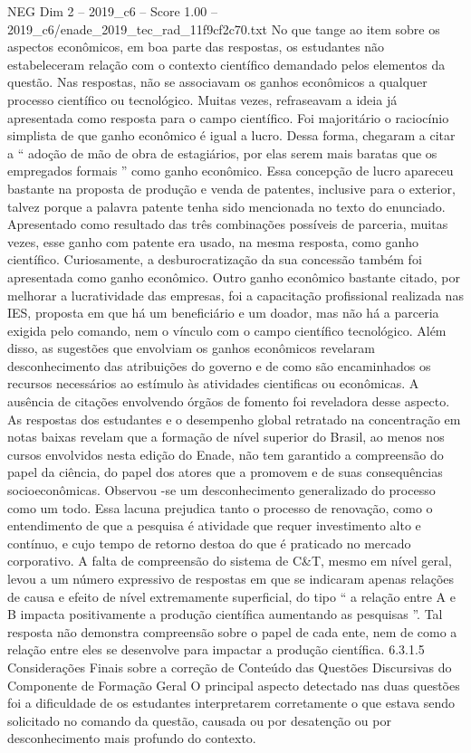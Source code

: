\begin{textsample}{NEG Dim 2 – 2019\_c6 – Score 1.00 – 2019\_c6/enade\_2019\_tec\_rad\_11f9cf2c70.txt}
No que tange ao item sobre os aspectos econômicos, em boa parte das respostas, os estudantes não estabeleceram relação com o contexto científico demandado pelos elementos da questão.
Nas respostas, não se associavam os ganhos econômicos a qualquer processo científico ou tecnológico.
Muitas vezes, refraseavam a ideia já apresentada como resposta para o campo científico.
Foi majoritário o raciocínio simplista de que ganho econômico é igual a lucro.
Dessa forma, chegaram a citar a “ adoção de mão de obra de estagiários, por elas serem mais baratas que os empregados formais ” como ganho econômico.
Essa concepção de lucro apareceu bastante na proposta de produção e venda de patentes, inclusive para o exterior, talvez porque a palavra patente tenha sido mencionada no texto do enunciado.
Apresentado como resultado das três combinações possíveis de parceria, muitas vezes, esse ganho com patente era usado, na mesma resposta, como ganho científico.
Curiosamente, a desburocratização da sua concessão também foi apresentada como ganho econômico.
Outro ganho econômico bastante citado, por melhorar a lucratividade das empresas, foi a capacitação profissional realizada nas IES, proposta em que há um beneficiário e um doador, mas não há a parceria exigida pelo comando, nem o vínculo com o campo científico tecnológico.
Além disso, as sugestões que envolviam os ganhos econômicos revelaram desconhecimento das atribuições do governo e de como são encaminhados os recursos necessários ao estímulo às atividades cientificas ou econômicas.
A ausência de citações envolvendo órgãos de fomento foi reveladora desse aspecto.
As respostas dos estudantes e o desempenho global retratado na concentração em notas baixas revelam que a formação de nível superior do Brasil, ao menos nos cursos envolvidos nesta edição do Enade, não tem garantido a compreensão do papel da ciência, do papel dos atores que a promovem e de suas consequências socioeconômicas.
Observou -se um desconhecimento generalizado do processo como um todo.
Essa lacuna prejudica tanto o processo de renovação, como o entendimento de que a pesquisa é atividade que requer investimento alto e contínuo, e cujo tempo de retorno destoa do que é praticado no mercado corporativo.
A falta de compreensão do sistema de C\&T, mesmo em nível geral, levou a um número expressivo de respostas em que se indicaram apenas relações de causa e efeito de nível extremamente superficial, do tipo “ a relação entre A e B impacta positivamente a produção científica aumentando as pesquisas ”.
Tal resposta não demonstra compreensão sobre o papel de cada ente, nem de como a relação entre eles se desenvolve para impactar a produção científica. 6.3.1.5 Considerações Finais sobre a correção de Conteúdo das Questões Discursivas do Componente de Formação Geral O principal aspecto detectado nas duas questões foi a dificuldade de os estudantes interpretarem corretamente o que estava sendo solicitado no comando da questão, causada ou por desatenção ou por desconhecimento mais profundo do contexto.

\end{textsample}

